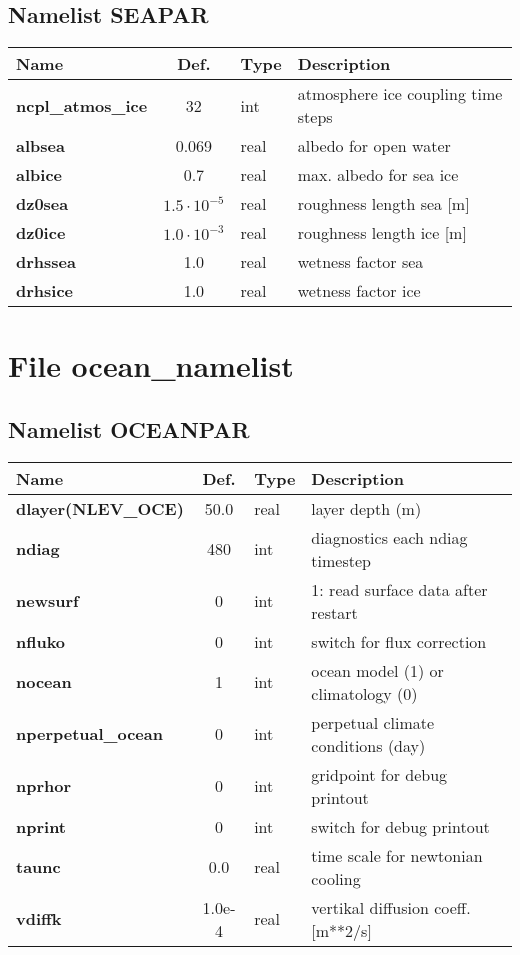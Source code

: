 \subsection{Namelist SEAPAR}
\begin{tabular}{|l|c|l|l|}                                  
\hline                                                        
Name   & Def. & Type & Description \\               
\hline                                                        
{\bf ncpl\_atmos\_ice  }& 32 & int & atmosphere ice coupling time steps \\
{\bf albsea  }& 0.069 & real & albedo for open water \\
{\bf albice  }& 0.7 & real & max. albedo for sea ice \\
{\bf dz0sea  }& $1.5\cdot 10^{-5}$ & real & roughness length sea [m]\\
{\bf dz0ice  }& $1.0\cdot 10^{-3}$ & real & roughness length ice [m]\\
{\bf drhssea  }& 1.0 & real & wetness factor sea \\
{\bf drhsice  }& 1.0 & real & wetness factor ice \\
\hline                                                        
\end{tabular}


\section{File ocean\_namelist}
\subsection{Namelist OCEANPAR}
\begin{tabular}{|l|c|l|l|}                                  
\hline                                                        
Name   & Def. & Type & Description \\               
\hline                                                        
{\bf dlayer(NLEV\_OCE)} & 50.0 & real & layer depth (m) \\
{\bf ndiag} & 480 & int & diagnostics each ndiag timestep \\
{\bf newsurf}& 0 & int & 1: read surface data after restart \\
{\bf nfluko}&  0 & int & switch for flux correction \\
{\bf nocean  }& 1 & int & ocean model (1) or climatology (0) \\  
{\bf nperpetual\_ocean}& 0 & int & perpetual climate conditions (day) \\
{\bf nprhor}& 0 & int & gridpoint for debug printout \\
{\bf nprint}& 0 & int & switch for debug printout \\
{\bf taunc}& 0.0 & real & time scale for newtonian cooling \\
{\bf vdiffk}& 1.0e-4 & real & vertikal diffusion coeff. [m**2/s] \\
\hline                                                        
\end{tabular}


